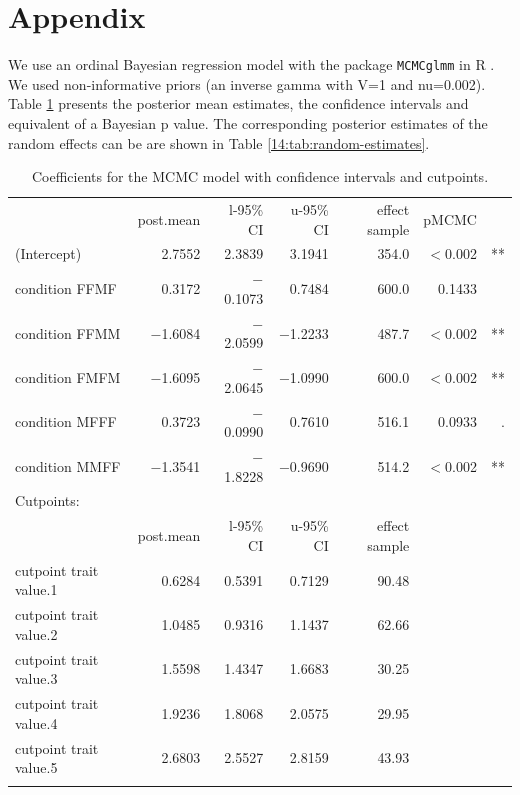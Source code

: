 \documentclass[output=paper,modfonts,newtxmath,hidelinks]{langscibook}
\begin{document}
\section*{Appendix}	
		
We use an ordinal Bayesian regression model with the package \texttt{MCMCglmm} \citep{Hadfield.2010} in R \citep{rcore}. We used non-informative priors (an inverse gamma with V=1 and nu=0.002).  Table \ref{14:tab:estimates} presents the posterior mean estimates, the confidence intervals and equivalent of a Bayesian p value. The corresponding posterior estimates of the random effects can be are shown in Table \ref{14:tab:random-estimates}.

\begin{table} 
\footnotesize

\begin{tabularx}{\textwidth}{lrrrrrr}
\lsptoprule
& post.mean & l-95\% CI & u-95\% CI & effect sample & pMCMC    &    \\
(Intercept)            & 2.7552    & 2.3839    & 3.1941    & 354.0         & $<$0.002 & ** \\
condition FFMF         & 0.3172    & $-$0.1073   & 0.7484    & 600.0         & 0.1433   &    \\
condition FFMM         & $-$1.6084   & $-$2.0599   & $-$1.2233   & 487.7         & $<$0.002 & ** \\
condition FMFM         & $-$1.6095   & $-$2.0645   & $-$1.0990   & 600.0         & $<$0.002 & ** \\
condition MFFF         & 0.3723    & $-$0.0990   & 0.7610    & 516.1         & 0.0933   & .  \\
condition MMFF         & $-$1.3541   & $-$1.8228   & $-$0.9690   & 514.2         & $<$0.002 & ** \\
\midrule
Cutpoints:                                                                                 \\
& post.mean & l-95\% CI & u-95\% CI & effect sample                 \\
cutpoint trait value.1 & 0.6284    & 0.5391    & 0.7129    & 90.48                         \\
cutpoint trait value.2 & 1.0485    & 0.9316    & 1.1437    & 62.66                         \\
cutpoint trait value.3 & 1.5598    & 1.4347    & 1.6683    & 30.25                         \\
cutpoint trait value.4 & 1.9236    & 1.8068    & 2.0575    & 29.95                         \\
cutpoint trait value.5 & 2.6803    & 2.5527    & 2.8159    & 43.93                         \\
\lspbottomrule
\end{tabularx}
\caption{Coefficients for the MCMC model with confidence intervals and cutpoints.}
\label{14:tab:estimates}
\end{table}
\end{document}
